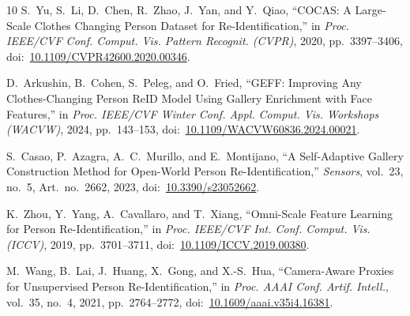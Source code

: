 \documentclass[journal,letterpaper]{IEEEtran}
\begin{document}
\begin{thebibliography}{10}
S.~Yu, S.~Li, D.~Chen, R.~Zhao, J.~Yan, and Y.~Qiao,
``COCAS: A Large-Scale Clothes Changing Person Dataset for Re-Identification,''
in \emph{Proc. IEEE/CVF Conf. Comput. Vis. Pattern Recognit. (CVPR)},
2020, pp.~3397--3406,
doi:~\url{10.1109/CVPR42600.2020.00346}.

D.~Arkushin, B.~Cohen, S.~Peleg, and O.~Fried,
``GEFF: Improving Any Clothes-Changing Person ReID Model Using Gallery Enrichment with Face Features,''
in \emph{Proc. IEEE/CVF Winter Conf. Appl. Comput. Vis. Workshops (WACVW)},
2024, pp.~143--153,
doi:~\url{10.1109/WACVW60836.2024.00021}.

S.~Casao, P.~Azagra, A.~C.~Murillo, and E.~Montijano,
``A Self-Adaptive Gallery Construction Method for Open-World Person Re-Identification,''
\emph{Sensors}, vol.~23, no.~5, Art.~no.~2662, 2023,
doi:~\url{10.3390/s23052662}.

K.~Zhou, Y.~Yang, A.~Cavallaro, and T.~Xiang,
``Omni-Scale Feature Learning for Person Re-Identification,''
in \emph{Proc. IEEE/CVF Int. Conf. Comput. Vis. (ICCV)},
2019, pp.~3701--3711,
doi:~\url{10.1109/ICCV.2019.00380}.

M.~Wang, B.~Lai, J.~Huang, X.~Gong, and X.-S.~Hua,
``Camera-Aware Proxies for Unsupervised Person Re-Identification,''
in \emph{Proc. AAAI Conf. Artif. Intell.},
vol.~35, no.~4, 2021, pp.~2764--2772,
doi:~\url{10.1609/aaai.v35i4.16381}.


\end{thebibliography}
\end{document}

